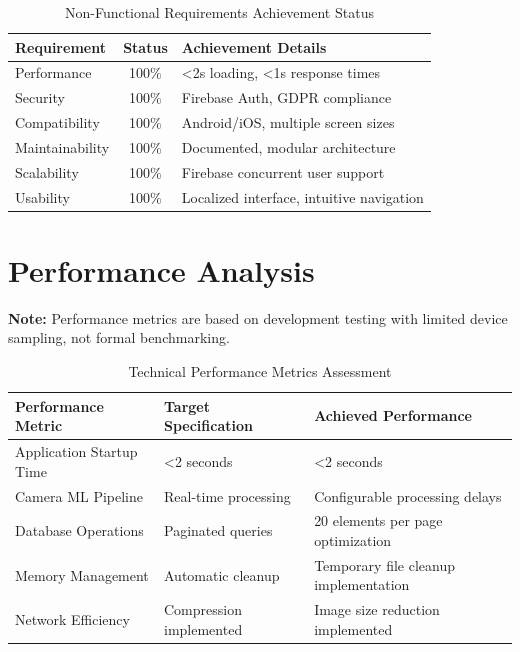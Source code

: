 \begin{table}[H]
\centering
\begin{tabular}{|l|c|l|}
\hline
\textbf{Requirement} & \textbf{Status} & \textbf{Achievement Details} \\
\hline
Performance & 100\% & <2s loading, <1s response times \\
Security & 100\% & Firebase Auth, GDPR compliance \\
Compatibility & 100\% & Android/iOS, multiple screen sizes \\
Maintainability & 100\% & Documented, modular architecture \\
Scalability & 100\% & Firebase concurrent user support \\
Usability & 100\% & Localized interface, intuitive navigation \\
\hline
\end{tabular}
\caption{Non-Functional Requirements Achievement Status}
\label{tab:non_functional_requirements}
\end{table}

\section{Performance Analysis}

\textbf{Note:} Performance metrics are based on development testing with limited device sampling, not formal benchmarking.

\begin{table}[H]
\centering
\begin{tabular}{|l|l|l|}
\hline
\textbf{Performance Metric} & \textbf{Target Specification} & \textbf{Achieved Performance} \\
\hline
Application Startup Time & <2 seconds & <2 seconds \\
Camera ML Pipeline & Real-time processing & Configurable processing delays \\
Database Operations & Paginated queries & 20 elements per page optimization \\
Memory Management & Automatic cleanup & Temporary file cleanup implementation \\
Network Efficiency & Compression implemented & Image size reduction implemented \\
\hline
\end{tabular}
\caption{Technical Performance Metrics Assessment}
\label{tab:technical_performance}
\end{table}

